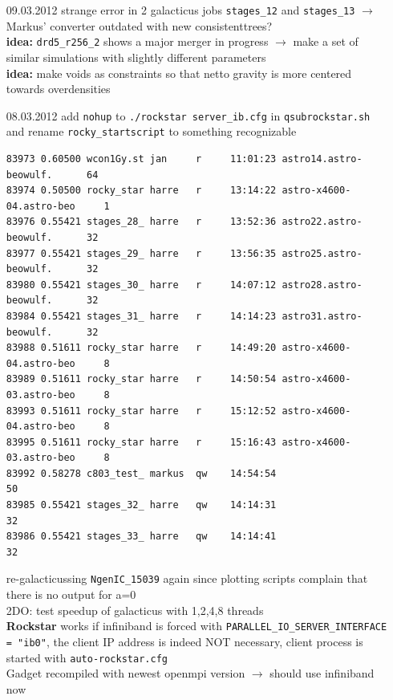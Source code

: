 \documentclass[a4paper,11pt,fleqn,oneside]{book}
\begin{document}
\begin{itemize}
\item[09.03.2012]
strange error in 2 galacticus jobs \texttt{stages\_12} and 
\texttt{stages\_13}  $\rightarrow$ Markus' converter 
outdated with new consistenttrees? \\
\textbf{idea:} \texttt{drd5\_r256\_2} shows a major merger in progress 
$\rightarrow$ make a set of similar simulations with 
slightly different parameters \\
\textbf{idea:} make voids as constraints so that netto gravity is 
more centered towards overdensities \\

\item[08.03.2012]
add \texttt{nohup} to \texttt{./rockstar server\_ib.cfg} 
in \texttt{qsubrockstar.sh} and rename \texttt{rocky\_startscript}
to something recognizable 
\begin{verbatim}
83973 0.60500 wcon1Gy.st jan     r     11:01:23 astro14.astro-beowulf.      64        
83974 0.50500 rocky_star harre   r     13:14:22 astro-x4600-04.astro-beo     1        
83976 0.55421 stages_28_ harre   r     13:52:36 astro22.astro-beowulf.      32        
83977 0.55421 stages_29_ harre   r     13:56:35 astro25.astro-beowulf.      32        
83980 0.55421 stages_30_ harre   r     14:07:12 astro28.astro-beowulf.      32        
83984 0.55421 stages_31_ harre   r     14:14:23 astro31.astro-beowulf.      32        
83988 0.51611 rocky_star harre   r     14:49:20 astro-x4600-04.astro-beo     8        
83989 0.51611 rocky_star harre   r     14:50:54 astro-x4600-03.astro-beo     8        
83993 0.51611 rocky_star harre   r     15:12:52 astro-x4600-04.astro-beo     8        
83995 0.51611 rocky_star harre   r     15:16:43 astro-x4600-03.astro-beo     8        
83992 0.58278 c803_test_ markus  qw    14:54:54                             50        
83985 0.55421 stages_32_ harre   qw    14:14:31                             32        
83986 0.55421 stages_33_ harre   qw    14:14:41                             32     
\end{verbatim}
re-galacticussing \texttt{NgenIC\_15039} again since 
plotting scripts complain that there is no output for 
a=0 \\
2DO: test speedup of galacticus with 1,2,4,8 threads \\
\textbf{Rockstar} works if infiniband is forced with 
\texttt{PARALLEL\_IO\_SERVER\_INTERFACE = "ib0"}, 
the client IP address is indeed NOT necessary, 
client process is started with \texttt{auto-rockstar.cfg} \\
Gadget recompiled with newest openmpi version $\rightarrow$ 
should use infiniband now \\


\end{itemize}
\end{document}
